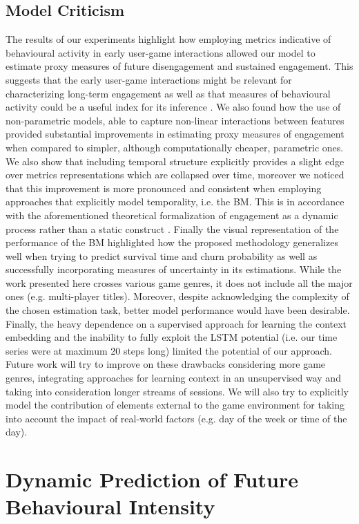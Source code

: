 \subsection{Model Criticism}
The results of our experiments highlight how employing metrics indicative of behavioural activity in early user-game interactions allowed our model to estimate proxy measures of future disengagement and sustained engagement. This suggests that the early user-game interactions might be relevant for characterizing long-term engagement as well as that measures of behavioural activity could be a useful index for its inference \cite{milovsevic2017early, mirza2013does}. We also found how the use of non-parametric models, able to capture non-linear interactions between features provided substantial improvements in estimating proxy measures of engagement when compared to simpler, although computationally cheaper, parametric ones. We also show that including temporal structure explicitly provides a slight edge over metrics representations which are collapsed over time, moreover we noticed that this improvement is more pronounced and consistent when employing approaches that explicitly model temporality, i.e. the BM. This is in accordance with the aforementioned theoretical formalization of engagement as a dynamic process rather than a static construct \cite{o2008user}. Finally the visual representation of the performance of the BM highlighted how the proposed methodology generalizes well when trying to predict survival time and churn probability as well as successfully incorporating measures of uncertainty in its estimations. While the work presented here crosses various game genres, it does not include all the major ones (e.g. multi-player titles). Moreover, despite acknowledging the complexity of the chosen estimation task, better model performance would have been desirable. Finally, the heavy dependence on a supervised approach for learning the context embedding and the inability to fully exploit the LSTM potential (i.e. our time series were at maximum 20 steps long) limited the potential of our approach. Future work will try to improve on these drawbacks considering more game genres, integrating approaches for learning context in an unsupervised way and taking into consideration longer streams of sessions. We will also try to explicitly model the contribution of elements external to the game environment for taking into account the impact of real-world factors (e.g. day of the week or time of the day).

\section{Dynamic Prediction of Future Behavioural Intensity}
\label{model_architecture_1}
\lorem

